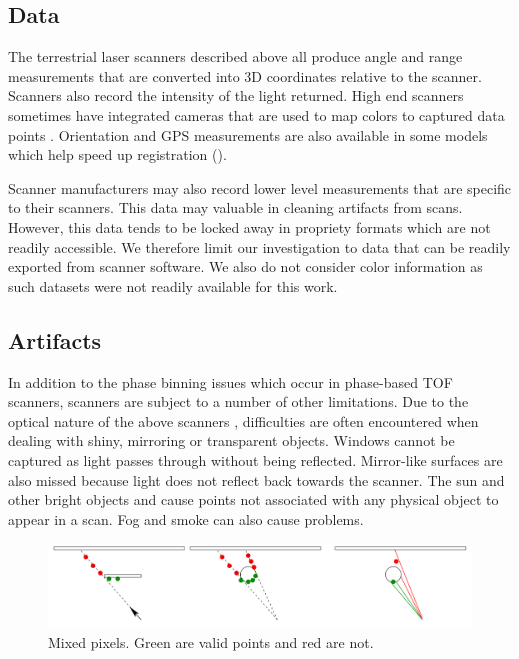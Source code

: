 \subsection{Data}

The terrestrial laser scanners described above all produce angle and range measurements that are converted into 3D coordinates relative to the scanner. Scanners also record the intensity of the light returned. High end scanners sometimes have integrated cameras that are used to map colors to captured data points \cite{Frohlich2004}. Orientation and GPS measurements are also available in some models which help speed up registration ().

Scanner manufacturers may also record lower level measurements that are specific to their scanners. This data may valuable in cleaning artifacts from scans. However, this data tends to be locked away in propriety formats which are not readily accessible. We therefore limit our investigation to data that can be readily exported from scanner software. We also do not consider color information as such datasets were not readily available for this work.


\subsection{Artifacts} \label{sec:artifacts}

In addition to the phase binning issues which occur in phase-based TOF scanners, scanners are subject to a number of other limitations. Due to the optical nature of the above scanners , difficulties are often encountered when dealing with shiny, mirroring or transparent objects. Windows cannot be captured as light passes through without being reflected. Mirror-like surfaces are also missed because light does not reflect back towards the scanner. The sun and other bright objects and cause points not associated with any physical object to appear in a scan. Fog and smoke can also cause problems.


\begin{figure}[ht]
  \centering
  \includegraphics[width=1\linewidth]{images/mixed-pixel}
  \caption{Mixed pixels. Green are valid points and red are not. \cite{Tuley2005}}
  \label{fig:mixed-pixel}
\end{figure}

